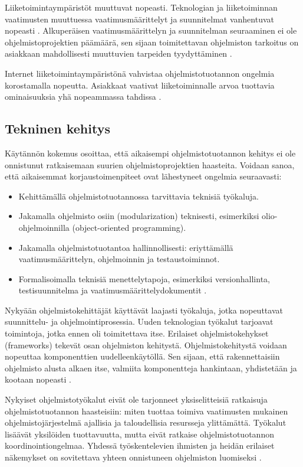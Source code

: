 \documentclass[finnish]{tktltiki2}
\theoremstyle{definition}
\theoremstyle{remark}
\begin{document}
Liiketoimintaympäristöt muuttuvat nopeasti. Teknologian ja liiketoiminnan vaatimusten muuttuessa vaatimusmäärittelyt ja suunnitelmat vanhentuvat nopeasti \cite{WIC03}. Alkuperäisen vaatimusmäärittelyn ja suunnitelman seuraaminen ei ole ohjelmistoprojektien päämäärä, sen sijaan toimitettavan ohjelmiston tarkoitus on asiakkaan mahdollisesti muuttuvien tarpeiden tyydyttäminen \cite{HIC01}.

Internet liiketoimintaympäristönä vahvistaa ohjelmistotuotannon ongelmia korostamalla nopeutta. Asiakkaat vaativat liiketoiminnalle arvoa tuottavia ominaisuuksia yhä nopeammassa tahdissa \cite{BRL03}.

\subsection{Tekninen kehitys}

Käytännön kokemus osoittaa, että aikaisempi ohjelmistotuotannon kehitys ei ole onnistunut ratkaisemaan suurien ohjelmistoprojektien haasteita. 
Voidaan sanoa, että aikaisemmat korjaustoimenpiteet ovat lähestyneet ongelmia seuraavasti: 
\begin{itemize}
 \item Kehittämällä ohjelmistotuotannossa tarvittavia teknisiä työkaluja.
 \item Jakamalla ohjelmisto osiin (modularization) teknisesti, esimerkiksi olio-ohjelmoinnilla (object-oriented programming). 
 \item Jakamalla ohjelmistotuotantoa hallinnollisesti: eriyttämällä vaatimusmäärittelyn, ohjelmoinnin ja testaustoiminnot.
 \item Formalisoimalla teknisiä menettelytapoja, esimerkiksi versionhallinta, testisuunnitelma ja vaatimusmäärittelydokumentit \cite{KES95}.
\end{itemize}

Nykyään ohjelmistokehittäjät käyttävät laajasti työkaluja, jotka nopeuttavat suunnittelu- ja ohjelmointiprosessia. Uuden teknologian työkalut tarjoavat toimintoja, jotka ennen oli toimitettava itse. Erilaiset ohjelmistokehykset (frameworks) tekevät osan ohjelmiston kehitystä. Ohjelmistokehitystä voidaan nopeuttaa komponenttien uudelleenkäytöllä. Sen sijaan, että rakennettaisiin ohjelmisto alusta alkaen itse, valmiita komponentteja hankintaan, yhdistetään ja kootaan nopeasti \cite{BRL03}.

Nykyiset ohjelmistotyökalut eivät ole tarjonneet yksiselitteisiä ratkaisuja ohjelmistotuotannon haasteisiin: miten tuottaa toimiva vaatimusten mukainen ohjelmistojärjestelmä ajallisia ja taloudellisia resursseja ylittämättä. Työkalut lisäävät yksilöiden tuottavuutta, mutta eivät ratkaise ohjelmistotuotannon koordinointiongelmaa. Yhdessä työskentelevien ihmisten ja heidän erilaiset näkemykset on sovitettava yhteen onnistuneen ohjelmiston luomiseksi \cite{KES95}.
\end{document}
